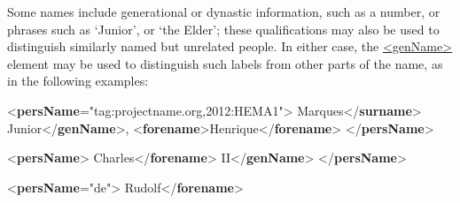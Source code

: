 Some names include generational or dynastic information, such as a number, or phrases such as ‘Junior’, or ‘the Elder’; these qualifications may also be used to distinguish similarly named but unrelated people. In either case, the \hyperref[TEI.genName]{<genName>} element may be used to distinguish such labels from other parts of the name, as in the following examples: \par\bgroup{}\exampleFont \begin{shaded}\noindent\mbox{}{<\textbf{persName}\hspace*{1em}{ref}="{tag:projectname.org,2012:HEMA1}">}\mbox{}\newline 
{}Marques{</\textbf{surname}>}\mbox{}\newline 
{}Junior{</\textbf{genName}>}, {<\textbf{forename}>}Henrique{</\textbf{forename}>}\mbox{}\newline 
{</\textbf{persName}>}\end{shaded}\egroup\par \noindent  \par\bgroup{}\exampleFont \begin{shaded}\noindent\mbox{}{<\textbf{persName}>}\mbox{}\newline 
{}Charles{</\textbf{forename}>}\mbox{}\newline 
{}II{</\textbf{genName}>}\mbox{}\newline 
{</\textbf{persName}>}\end{shaded}\egroup\par \noindent  \par\bgroup{}\exampleFont \begin{shaded}\noindent\mbox{}{<\textbf{persName}\hspace*{1em}{xml:lang}="{de}">}\mbox{}\newline 
{}Rudolf{</\textbf{forename}>}\mbox{}\newline 

\end{shaded}
